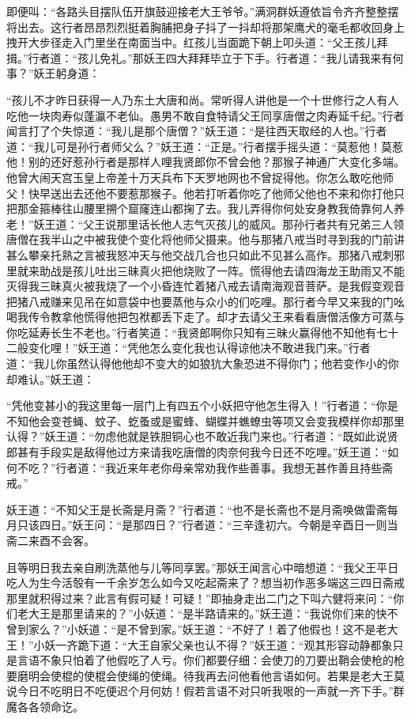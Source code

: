 \documentclass[12pt,UTF8]{ctexbook}
\begin{document}
{即便叫：“各路头目摆队伍开旗鼓迎接老大王爷爷。”满洞群妖遵依旨令齐齐整整摆将出去。这行者昂昂烈烈挺着胸脯把身子抖了一抖却将那架鹰犬的毫毛都收回身上拽开大步径走入门里坐在南面当中。红孩儿当面跪下朝上叩头道：“父王孩儿拜揖。”行者道：“孩儿免礼。”那妖王四大拜拜毕立于下手。行者道：“我儿请我来有何事？”妖王躬身道：

“孩儿不才昨日获得一人乃东土大唐和尚。常听得人讲他是一个十世修行之人有人吃他一块肉寿似蓬瀛不老仙。愚男不敢自食特请父王同享唐僧之肉寿延千纪。”行者闻言打了个失惊道：“我儿是那个唐僧？”妖王道：“是往西天取经的人也。”行者道：“我儿可是孙行者师父么？”妖王道：“正是。”行者摆手摇头道：“莫惹他！莫惹他！别的还好惹孙行者是那样人哩我贤郎你不曾会他？那猴子神通广大变化多端。他曾大闹天宫玉皇上帝差十万天兵布下天罗地网也不曾捉得他。你怎么敢吃他师父！快早送出去还他不要惹那猴子。他若打听着你吃了他师父他也不来和你打他只把那金箍棒往山腰里搠个窟窿连山都掬了去。我儿弄得你何处安身教我倚靠何人养老！”妖王道：“父王说那里话长他人志气灭孩儿的威风。那孙行者共有兄弟三人领唐僧在我半山之中被我使个变化将他师父摄来。他与那猪八戒当时寻到我的门前讲甚么攀亲托熟之言被我怒冲天与他交战几合也只如此不见甚么高作。那猪八戒刺邪里就来助战是孩儿吐出三昧真火把他烧败了一阵。慌得他去请四海龙王助雨又不能灭得我三昧真火被我烧了一个小昏连忙着猪八戒去请南海观音菩萨。是我假变观音把猪八戒赚来见吊在如意袋中也要蒸他与众小的们吃哩。那行者今早又来我的门吆喝我传令教拿他慌得他把包袱都丢下走了。却才去请父王来看看唐僧活像方可蒸与你吃延寿长生不老也。”行者笑道：“我贤郎啊你只知有三昧火赢得他不知他有七十二般变化哩！”妖王道：“凭他怎么变化我也认得谅他决不敢进我门来。”行者道：“我儿你虽然认得他他却不变大的如狼犺大象恐进不得你门；他若变作小的你却难认。”妖王道：

“凭他变甚小的我这里每一层门上有四五个小妖把守他怎生得入！”行者道：“你是不知他会变苍蝇、蚊子、虼蚤或是蜜蜂、蝴蝶并蟭蟟虫等项又会变我模样你却那里认得？”妖王道：“勿虑他就是铁胆铜心也不敢近我门来也。”行者道：“既如此说贤郎甚有手段实是敌得他过方来请我吃唐僧的肉奈何我今日还不吃哩。”妖王道：“如何不吃？”行者道：“我近来年老你母亲常劝我作些善事。我想无甚作善且持些斋戒。”

妖王道：“不知父王是长斋是月斋？”行者道：“也不是长斋也不是月斋唤做雷斋每月只该四日。”妖王问：“是那四日？”行者道：“三辛逢初六。今朝是辛酉日一则当斋二来酉不会客。

且等明日我去亲自刷洗蒸他与儿等同享罢。”那妖王闻言心中暗想道：“我父王平日吃人为生今活彀有一千余岁怎么如今又吃起斋来了？想当初作恶多端这三四日斋戒那里就积得过来？此言有假可疑！可疑！”即抽身走出二门之下叫六健将来问：“你们老大王是那里请来的？”小妖道：“是半路请来的。”妖王道：“我说你们来的快不曾到家么？”小妖道：“是不曾到家。”妖王道：“不好了！着了他假也！这不是老大王！”小妖一齐跪下道：“大王自家父亲也认不得？”妖王道：“观其形容动静都象只是言语不象只怕着了他假吃了人亏。你们都要仔细：会使刀的刀要出鞘会使枪的枪要磨明会使棍的使棍会使绳的使绳。待我再去问他看他言语如何。若果是老大王莫说今日不吃明日不吃便迟个月何妨！假若言语不对只听我哏的一声就一齐下手。”群魔各各领命讫。

}
\end{document}
